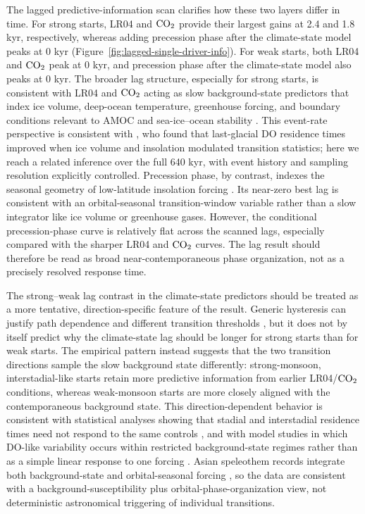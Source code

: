 \documentclass[11pt]{article}
\begin{document}
The lagged predictive-information scan clarifies how these two layers differ in time. For strong starts, LR04 and \(\ce{CO2}\) provide their largest gains at 2.4 and 1.8 kyr, respectively, whereas adding precession phase after the climate-state model peaks at 0 kyr (Figure~\ref{fig:lagged-single-driver-info}). For weak starts, both LR04 and \(\ce{CO2}\) peak at 0 kyr, and precession phase after the climate-state model also peaks at 0 kyr. The broader lag structure, especially for strong starts, is consistent with LR04 and \(\ce{CO2}\) acting as slow background-state predictors that index ice volume, deep-ocean temperature, greenhouse forcing, and boundary conditions relevant to AMOC and sea-ice--ocean stability \citep{zhang2017abrupt,vettoretti2022atmospheric,zhang2021direct}. This event-rate perspective is consistent with \citet{lohmann2018random}, who found that last-glacial DO residence times improved when ice volume and insolation modulated transition statistics; here we reach a related inference over the full 640 kyr, with event history and sampling resolution explicitly controlled. Precession phase, by contrast, indexes the seasonal geometry of low-latitude insolation forcing \citep{berger1978long,berger1991insolation}. Its near-zero best lag is consistent with an orbital-seasonal transition-window variable rather than a slow integrator like ice volume or greenhouse gases. However, the conditional precession-phase curve is relatively flat across the scanned lags, especially compared with the sharper LR04 and \(\ce{CO2}\) curves. The lag result should therefore be read as broad near-contemporaneous phase organization, not as a precisely resolved response time.

The strong--weak lag contrast in the climate-state predictors should be treated as a more tentative, direction-specific feature of the result. Generic hysteresis can justify path dependence and different transition thresholds \citep{stommel1961thermohaline,ganopolski2001rapid}, but it does not by itself predict why the climate-state lag should be longer for strong starts than for weak starts. The empirical pattern instead suggests that the two transition directions sample the slow background state differently: strong-monsoon, interstadial-like starts retain more predictive information from earlier LR04/\(\ce{CO2}\) conditions, whereas weak-monsoon starts are more closely aligned with the contemporaneous background state. This direction-dependent behavior is consistent with statistical analyses showing that stadial and interstadial residence times need not respond to the same controls \citep{lohmann2018random}, and with model studies in which DO-like variability occurs within restricted background-state regimes rather than as a simple linear response to one forcing \citep{zhang2017abrupt,vettoretti2022atmospheric}. Asian speleothem records integrate both background-state and orbital-seasonal forcing \citep{cheng2016asian,corrick2020synchronous,xie2023contributions}, so the data are consistent with a background-susceptibility plus orbital-phase-organization view, not deterministic astronomical triggering of individual transitions.
\end{document}
